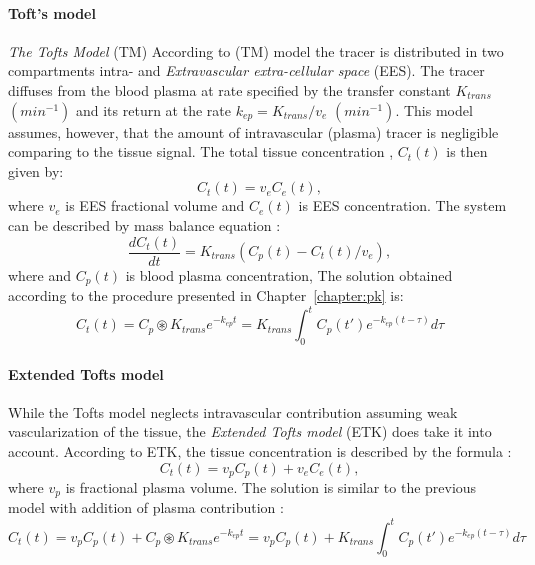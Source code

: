 \paragraph{Toft's model}
\textit{The Tofts Model} \cite{tofts1991measurement} (TM) According to (TM) model  the tracer is distributed in two compartments intra- and \textit{Extravascular extra-cellular space} (EES).
The tracer diffuses from the blood plasma at rate specified by the transfer constant $K_{trans}$ $(min^{-1})$ and its return at the rate $k_{ep} = K_{trans}/v_e$ $(min^{-1})$. This model assumes, however, that the amount of intravascular (plasma) tracer is negligible comparing to the tissue signal. The total tissue concentration , $C_t(t)$ is then given by\cite{khalifa2014models}:
\begin{equation}
C_t(t) = v_eC_e(t),
\end{equation}
where $v_e$ is EES fractional volume and $C_e(t)$ is EES concentration. The system can be described by mass balance equation  \cite{tofts2010t1, sourbron2011scope}: 
\begin{equation}
	\label{eq:toft}
	\frac{dC_{t}(t)}{dt} = K_{trans}(C_p(t)-C_t(t)/v_e),
\end{equation} 
where  and $C_p(t)$ is blood plasma concentration, The solution obtained according to the procedure presented in Chapter~\ref{chapter:pk} is:
\begin{equation}
	\label{eq:toft2}
	C_{t}(t) =C_p\circledast K_{trans}e^{-k_{ep}t} =K_{trans}\int_{0}^{t}C_p(t')e^{-k_{ep}(t-\tau)}d\tau  
\end{equation}

\paragraph{Extended Tofts model}
While the Tofts model neglects intravascular contribution assuming weak vascularization of the tissue, the \textit{Extended Tofts model} (ETK) \cite{tofts1997modeling} does take it into account. According to ETK, the tissue concentration is described by the formula \cite{sourbron2011scope, khalifa2014models}:
\begin{equation}
C_t(t) = v_pC_p(t) + v_eC_e(t),
\end{equation}
where $v_p$ is fractional plasma volume. The solution is similar to the previous model with addition of plasma contribution \cite{sourbron2011scope}:
\begin{equation}
	\label{eq:extended_toft}
	C_{t}(t) =v_pC_p(t) + C_p\circledast K_{trans}e^{-k_{ep}t} = v_pC_p(t)+K_{trans}\int_{0}^{t}C_p(t')e^{-k_{ep}(t-\tau)}d\tau 
\end{equation}



